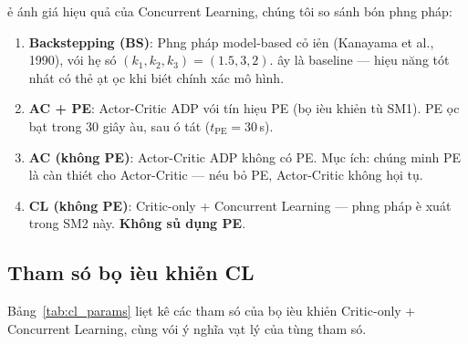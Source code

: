 \documentclass[12pt,a4paper]{article}
\begin{document}
\DJ\h{e} \dj\'{a}nh gi\'{a} hi\d{e}u qu\h{a} c\h{u}a Concurrent Learning, ch\'{u}ng t\^{o}i so s\'{a}nh b\'{o}n ph\uhorn{}\ohorn{}ng ph\'{a}p:

\begin{enumerate}
    \item \textbf{Backstepping (BS)}: Ph\uhorn{}\ohorn{}ng ph\'{a}p model-based c\h{o} \dj i\h{e}n (Kanayama et al., 1990), v\'{o}i h\d{e} s\'{o} $(k_1, k_2, k_3) = (1.5, 3, 2)$. \DJ\^{a}y l\`{a} baseline --- hi\d{e}u n\u{a}ng t\'{o}t nh\'{a}t c\'{o} th\h{e} \dj\d{a}t \dj\uhorn{}\d{o}c khi bi\'{e}t ch\'{i}nh x\'{a}c m\^{o} h\`{i}nh.

    \item \textbf{AC + PE}: Actor-Critic ADP v\'{o}i t\'{i}n hi\d{e}u PE (b\d{o} \dj i\`{e}u khi\h{e}n t\`{u} SM1). PE \dj\uhorn{}\d{o}c b\d{a}t trong 30 gi\^{a}y \dj\`{a}u, sau \dj\'{o} t\'{a}t ($t_\text{PE} = 30$\,s).

    \item \textbf{AC (kh\^{o}ng PE)}: Actor-Critic ADP kh\^{o}ng c\'{o} PE. M\d{u}c \dj\'{i}ch: ch\'{u}ng minh PE l\`{a} c\`{a}n thi\'{e}t cho Actor-Critic --- n\'{e}u b\h{o} PE, Actor-Critic kh\^{o}ng h\d{o}i t\d{u}.

    \item \textbf{CL (kh\^{o}ng PE)}: Critic-only + Concurrent Learning --- ph\uhorn{}\ohorn{}ng ph\'{a}p \dj\`{e} xu\'{a}t trong SM2 n\`{a}y. \textbf{Kh\^{o}ng s\h{u} d\d{u}ng PE}.
\end{enumerate}

\subsection{Tham s\'{o} b\d{o} \dj i\`{e}u khi\h{e}n CL}

B\h{a}ng~\ref{tab:cl_params} li\d{e}t k\^{e} c\'{a}c tham s\'{o} c\h{u}a b\d{o} \dj i\`{e}u khi\h{e}n Critic-only + Concurrent Learning, c\`{u}ng v\'{o}i \'{y} ngh\~{i}a v\d{a}t l\'{y} c\h{u}a t\`{u}ng tham s\'{o}.
\end{document}
